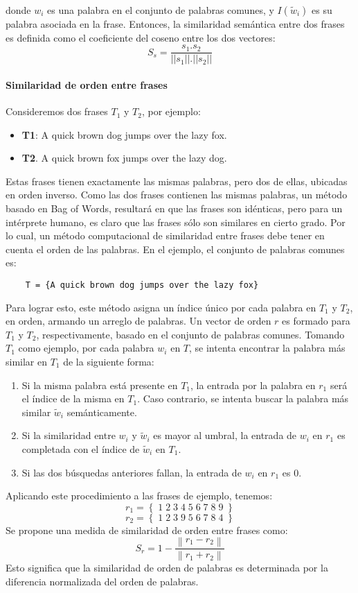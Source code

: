 donde \(w_i\) es una palabra en el conjunto de palabras comunes, y \(I(\widetilde{w}_i)\) es su palabra asociada en la frase. Entonces, la similaridad semántica entre dos frases es definida como el coeficiente del coseno entre los dos vectores:
\[S_s = \frac{s_1.s_2}{||s_1||.||s_2||}\]

\paragraph{Similaridad de orden entre frases}
Consideremos dos frases \(T_1\) y \(T_2\), por ejemplo:
\begin{itemize}
	\item \textbf{T1}:  A quick brown dog jumps over the lazy fox.
	\item \textbf{T2}. A quick brown fox jumps over the lazy dog.
\end{itemize}

Estas frases tienen exactamente las mismas palabras, pero dos de ellas, ubicadas en orden inverso. Como las dos frases contienen las mismas palabras, un método basado en Bag of Words, resultará en que las frases son idénticas, pero para un intérprete humano, es claro que las frases sólo son similares en cierto grado. Por lo cual, un método computacional de similaridad entre frases debe tener en cuenta el orden de las palabras. En el ejemplo, el conjunto de palabras comunes es:
\begin{verbatim}
	T = {A quick brown dog jumps over the lazy fox}
\end{verbatim}

Para lograr esto, este método asigna un índice único por cada palabra en \(T_1\) y \(T_2\), en orden, armando un arreglo de palabras. Un vector de orden \(r\) es formado para \(T_1\) y \(T_2\), respectivamente, basado en el conjunto de palabras comunes. Tomando \(T_1\) como ejemplo, por cada palabra \(w_i\) en \(T\), se intenta encontrar la palabra más similar en \(T_1\) de la siguiente forma:
\begin{enumerate}
	\item Si la misma palabra está presente en \(T_1\), la entrada por la palabra en \(r_1\) será el índice de la misma en \(T_1\). Caso contrario, se intenta buscar la palabra más similar \(\widetilde{w}_i \) semánticamente.
	\item Si la similaridad entre \(w_i\) y \(\widetilde{w}_i \) es mayor al umbral, la entrada de \(w_i\) en \(r_1\) es completada con el índice de \(\widetilde{w}_i \) en \(T_1\).
	\item Si las dos búsquedas anteriores fallan, la entrada de \(w_i \) en \(r_1\) es \(0\).
\end{enumerate}
Aplicando este procedimiento a las frases de ejemplo, tenemos:
\[r_1 = \left \{\;1\;2\;3\;4\;5\;6\;7\;8\;9\;\right \}\]
\[r_2 = \left \{\;1\;2\;3\;9\;5\;6\;7\;8\;4\;\right \}\]
Se propone una medida de similaridad de orden entre frases como:
\[S_r = 1 - \frac{\left \| r_1 - r_2 \right \|}{\left \| r_1 + r_2 \right \|}\]
Esto significa que la similaridad de orden de palabras es determinada por la diferencia normalizada del orden de palabras.

